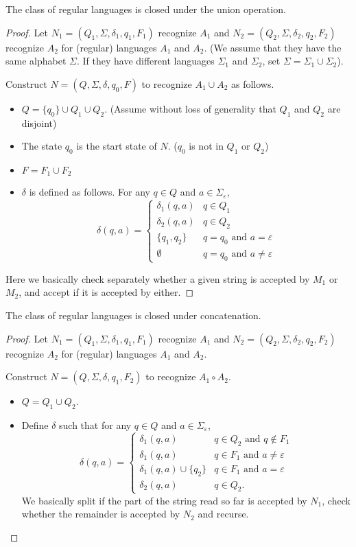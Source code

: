 \begin{theorem}
The class of regular languages is closed under the union operation.
\end{theorem}
\begin{proof}
Let $N_1=(Q_1,\Sigma,\delta_1,q_1,F_1)$ recognize $A_1$ and $N_2=(Q_2,\Sigma,\delta_2,q_2,F_2)$ recognize $A_2$ for (regular) languages $A_1$ and $A_2$. (We assume that they have the same alphabet $\Sigma$. If they have different languages $\Sigma_1$ and $\Sigma_2$, set $\Sigma=\Sigma_1\cup\Sigma_2$).

Construct $N=(Q,\Sigma,\delta,q_0,F)$ to recognize $A_1\cup A_2$ as follows.
\begin{itemize}
	\item $Q=\{q_0\}\cup Q_1\cup Q_2$. (Assume without loss of generality that $Q_1$ and $Q_2$ are disjoint)
	\item The state $q_0$ is the start state of $N$. ($q_0$ is not in $Q_1$ or $Q_2$)
	\item $F=F_1\cup F_2$
	\item $\delta$ is defined as follows. For any $q\in Q$ and $a\in\Sigma_\varepsilon$,
	$$
	\delta(q,a)=
	\begin{cases}
	\delta_1(q,a) & q\in Q_1 \\
	\delta_2(q,a) & q\in Q_2 \\
	\{q_1,q_2\} & q=q_0\text{ and }a=\varepsilon \\
	\emptyset & q=q_0\text{ and }a\neq\varepsilon
	\end{cases}
	$$
\end{itemize}
Here we basically check separately whether a given string is accepted by $M_1$ or $M_2$, and accept if it is accepted by either.
\end{proof}

\begin{theorem}
The class of regular languages is closed under concatenation.
\end{theorem}
\begin{proof}
Let $N_1=(Q_1,\Sigma,\delta_1,q_1,F_1)$ recognize $A_1$ and $N_2=(Q_2,\Sigma,\delta_2,q_2,F_2)$ recognize $A_2$ for (regular) languages $A_1$ and $A_2$.

Construct $N=(Q,\Sigma,\delta,q_1,F_2)$ to recognize $A_1\circ A_2$.
\begin{itemize}
	\item $Q=Q_1\cup Q_2$.
	\item Define $\delta$ such that for any $q\in Q$ and $a\in\Sigma_\varepsilon$,
	$$
	\delta(q,a)=
	\begin{cases}
	\delta_1(q,a) & q\in Q_2\text{ and }q\not\in F_1 \\
	\delta_1(q,a) & q\in F_1\text{ and }a\neq\varepsilon \\
	\delta_1(q,a)\cup \{q_2\} & q\in F_1\text{ and }a=\varepsilon \\
	\delta_2(q,a) & q\in Q_2.
	\end{cases}
	$$
	We basically split if the part of the string read so far is accepted by $N_1$, check whether the remainder is accepted by $N_2$ and recurse.
\end{itemize}
\end{proof}


